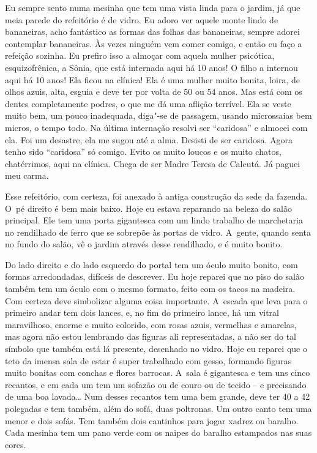 Eu sempre sento numa mesinha que tem uma vista linda para o jardim, já
que meia parede do refeitório é de vidro. Eu adoro ver aquele monte
lindo de bananeiras, acho fantástico as formas das folhas das
bananeiras, sempre adorei contemplar bananeiras. Às vezes ninguém vem
comer comigo, e então eu faço a refeição sozinha. Eu prefiro isso a
almoçar com aquela mulher psicótica, esquizofrênica, a Sônia, que está
internada aqui há 10 anos! O filho a internou aqui há 10 anos! Ela ficou
 na clínica! Ela é uma mulher muito bonita, loira, de olhos
azuis, alta, esguia e deve ter por volta de 50 ou 54 anos. Mas está com
os dentes completamente podres, o que me dá uma aflição terrível. Ela se
veste muito bem, um pouco inadequada, diga"-se de passagem, usando
microssaias bem micros, o tempo todo. Na última internação resolvi ser
``caridosa'' e almocei com ela. Foi um desastre, ela me sugou até a
alma. Desisti de ser caridosa. Agora tenho sido ``caridosa'' só comigo.
Evito os muito loucos e os muito chatos, chatérrimos, aqui na clínica.
Chega de ser Madre Teresa de Calcutá. Já paguei meu carma.

Esse refeitório, com certeza, foi anexado à antiga construção da sede da
fazenda. O~pé direito é bem mais baixo. Hoje eu estava reparando na
beleza do salão principal. Ele tem uma porta gigantesca com um lindo
trabalho de marchetaria no rendilhado de ferro que se sobrepõe às portas
de vidro. A~gente, quando senta no fundo do salão, vê o jardim através
desse rendilhado, e é muito bonito.

Do lado direito e do lado esquerdo do portal tem um óculo muito bonito,
com formas arredondadas, difíceis de descrever. Eu hoje reparei que no
piso do salão também tem um óculo com o mesmo formato, feito com os
tacos na madeira. Com certeza deve simbolizar alguma coisa importante. A~escada que leva para o primeiro andar tem dois lances, e, no fim do
primeiro lance, há um vitral maravilhoso, enorme e muito colorido, com
rosas azuis, vermelhas e amarelas, mas agora não estou lembrando das
figuras ali representadas, a não ser do tal símbolo que também está lá
presente, desenhado no vidro. Hoje eu reparei que o teto da imensa sala
de estar é super trabalhado com gesso, formando figuras muito bonitas
com conchas e flores barrocas. A~sala é gigantesca e tem uns cinco
recantos, e em cada um tem um sofazão ou de couro ou de tecido -- e
precisando de uma boa lavada… Num desses recantos tem uma  bem
grande, deve ter 40 a 42 polegadas e tem também, além do sofá, duas
poltronas. Um outro canto tem uma  menor e dois sofás. Tem também dois
cantinhos para jogar xadrez ou baralho. Cada mesinha tem um pano verde
com os naipes do baralho estampados nas suas cores.

